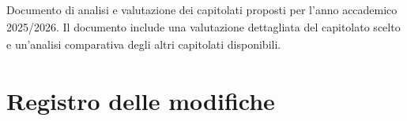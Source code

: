 \documentclass[a4paper,11pt]{article}
\begin{document}
\vspace{0.5cm}

\begin{center}
\begin{tcolorbox}[colback=secondaryblue!10,colframe=secondaryblue,width=0.9\textwidth,arc=3mm,boxrule=0.8pt,title={\bfseries Abstract}]
Documento di analisi e valutazione dei capitolati\textsubscript{}
 proposti per l'anno accademico 2025/2026. Il documento include una valutazione dettagliata del capitolato\textsubscript{}
 scelto e un'analisi comparativa degli altri capitolati\textsubscript{}
 disponibili.
\end{tcolorbox}
\end{center}

\newpage
\section*{Registro delle modifiche}

\setlength{\extrarowheight}{2pt} %
\renewcommand{\arraystretch}{1.5} 
\end{document}
